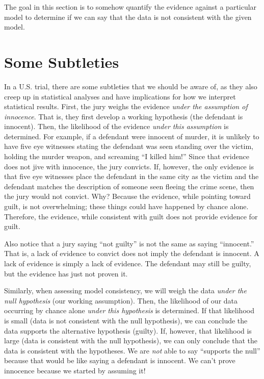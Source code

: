 \documentclass[]{book}
\theoremstyle{definition}
\theoremstyle{definition}
\theoremstyle{remark}
\begin{document}
The goal in this section is to somehow quantify the evidence against a
particular model to determine if we can say that the data is not
consistent with the given model.

\section{Some Subtleties}\label{some-subtleties}

In a U.S. trial, there are some subtleties that we should be aware of,
as they also creep up in statistical analyses and have implications for
how we interpret statistical results. First, the jury weighs the
evidence \emph{under the assumption of innocence}. That is, they first
develop a working hypothesis (the defendant is innocent). Then, the
likelihood of the evidence \emph{under this assumption} is determined.
For example, if a defendant were innocent of murder, it is unlikely to
have five eye witnesses stating the defendant was seen standing over the
victim, holding the murder weapon, and screaming ``I killed him!'' Since
that evidence does not jive with innocence, the jury convicts. If,
however, the only evidence is that five eye witnesses place the
defendant in the same city as the victim and the defendant matches the
description of someone seen fleeing the crime scene, then the jury would
not convict. Why? Because the evidence, while pointing toward guilt, is
not overwhelming; these things could have happened by chance alone.
Therefore, the evidence, while consistent with guilt does not provide
evidence for guilt.

Also notice that a jury saying ``not guilty'' is not the same as saying
``innocent.'' That is, a lack of evidence to convict does not imply the
defendant is innocent. A lack of evidence is simply a lack of evidence.
The defendant may still be guilty, but the evidence has just not proven
it.

Similarly, when assessing model consistency, we will weigh the data
\emph{under the null hypothesis} (our working assumption). Then, the
likelihood of our data occurring by chance alone \emph{under this
hypothesis} is determined. If that likelihood is small (data is not
consistent with the null hypothesis), we can conclude the data supports
the alternative hypothesis (guilty). If, however, that likelihood is
large (data is consistent with the null hypothesis), we can only
conclude that the data is consistent with the hypotheses. We are
\emph{not} able to say ``supports the null'' because that would be like
saying a defendant is innocent. We can't prove innocence because we
started by assuming it!
\end{document}
